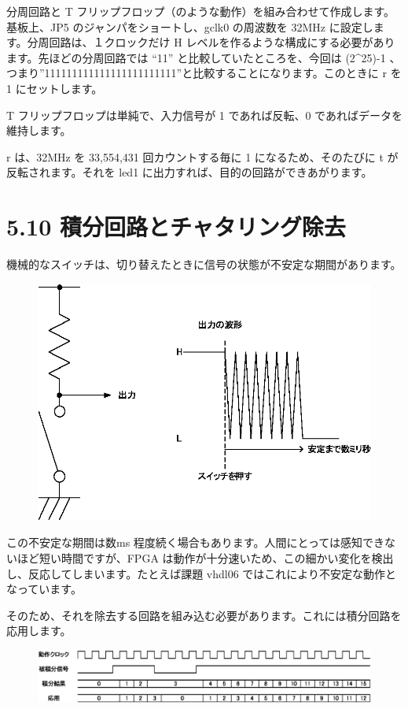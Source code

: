 \documentclass[letterpaper,10pt,dvipdfmx]{sphinxmanual}
\begin{document}
分周回路と T フリップフロップ（のような動作）を組み合わせて作成します。基板上、JP5 のジャンパをショートし、gclk0 の周波数を 32MHz に設定します。分周回路は、１クロックだけ H レベルを作るような構成にする必要があります。先ほどの分周回路では ``11'' と比較していたところを、今回は (2\textasciicircum{}25)-1 、つまり''111111111111111111111111''と比較することになります。このときに r を 1 にセットします。

T フリップフロップは単純で、入力信号が 1 であれば反転、0 であればデータを維持します。

r は、32MHz を 33,554,431 回カウントする毎に 1 になるため、そのたびに t が反転されます。それを led1 に出力すれば、目的の回路ができあがります。


\section{5.10 積分回路とチャタリング除去}
\label{05_try:id17}
機械的なスイッチは、切り替えたときに信号の状態が不安定な期間があります。
\begin{figure}[htbp]
\centering

\includegraphics{figure18.eps}
\end{figure}

この不安定な期間は数ms 程度続く場合もあります。人間にとっては感知できないほど短い時間ですが、FPGA は動作が十分速いため、この細かい変化を検出し、反応してしまいます。たとえば課題 vhdl06 ではこれにより不安定な動作となっています。

そのため、それを除去する回路を組み込む必要があります。これには積分回路を応用します。
\begin{figure}[htbp]
\centering

\includegraphics{figure19.eps}
\end{figure}
\end{document}
